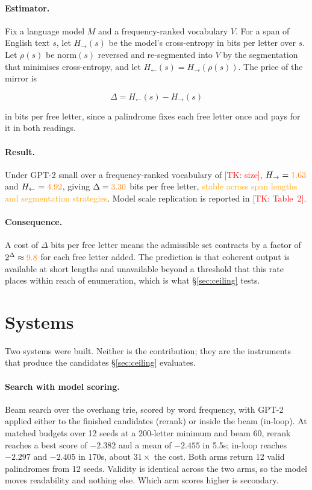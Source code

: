 \documentclass[11pt]{article}
\newif\ifprovenance\provenancetrue
\newcommand{\unver}[1]{\ifprovenance\textcolor{orange}{#1}\else#1\fi}
\newcommand{\tk}[1]{\ifprovenance\textcolor{red}{[TK: #1]}\else#1\fi}
\begin{document}
\paragraph{Estimator.}
Fix a language model $M$ and a frequency-ranked vocabulary $V$. For a span of
English text $s$, let $H_{\rightarrow}(s)$ be the model's cross-entropy in bits
per letter over $s$. Let $\rho(s)$ be $\mathrm{norm}(s)$ reversed and
re-segmented into $V$ by the segmentation that minimises cross-entropy, and let
$H_{\leftarrow}(s) = H_{\rightarrow}(\rho(s))$. The price of the mirror is

\[ \Delta = H_{\leftarrow}(s) - H_{\rightarrow}(s) \]

in bits per free letter, since a palindrome fixes each free letter once and
pays for it in both readings.

\paragraph{Result.}
Under GPT-2 small over a frequency-ranked vocabulary of \tk{size},
$H_{\rightarrow} = \unver{1.63}$ and $H_{\leftarrow} = \unver{4.92}$, giving
$\Delta = \unver{3.30}$ bits per free letter, \unver{stable across span lengths
and segmentation strategies}. Model scale replication is reported in
\tk{Table~2}.

\paragraph{Consequence.}
A cost of $\Delta$ bits per free letter means the admissible set contracts by a
factor of $2^{\Delta} \approx \unver{9.8}$ for each free letter added. The
prediction is that coherent output is available at short lengths and
unavailable beyond a threshold that this rate places within reach of
enumeration, which is what \S\ref{sec:ceiling} tests.

\section{Systems}
\label{sec:systems}

Two systems were built. Neither is the contribution; they are the instruments
that produce the candidates \S\ref{sec:ceiling} evaluates.

\paragraph{Search with model scoring.}
Beam search over the overhang trie, scored by word frequency, with GPT-2
applied either to the finished candidates (rerank) or inside the beam (in-loop).
At matched budgets over 12 seeds at a 200-letter minimum and beam 60, rerank
reaches a best score of $-2.382$ and a mean of $-2.455$ in 5.5s; in-loop
reaches $-2.297$ and $-2.405$ in 170s, about $31\times$ the cost. Both arms
return 12 valid palindromes from 12 seeds. Validity is identical across the two arms, so the
model moves readability and nothing else. Which arm scores higher is
secondary.
\end{document}
